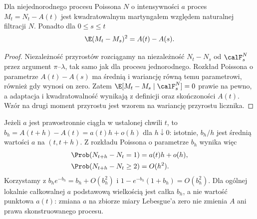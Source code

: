 \begin{wniosek}
Dla niejednorodnego procesu Poissona $N$ o intensywności $a$
proces $M_t=N_t-A(t)$ jest kwadratowalnym martyngałem
względem naturalnej filtracji $N$. Ponadto dla $0\le s\le t$
\[
\E(M_t-M_s)^2=A(t)-A(s).
\]
\end{wniosek}
\begin{proof}
Niezależność przyrostów rozciągamy na niezależność
$N_t-N_s$ od $\calF_s^N$ przez argument
$\pi$--$\lambda$, tak samo jak dla procesu jednorodnego.
Rozkład Poissona o parametrze $A(t)-A(s)$ ma średnią
i wariancję równą temu parametrowi, również gdy wynosi
on zero. Zatem
$\E[M_t-M_s\mid\calF_s^N]=0$ prawie na pewno,
a adaptacja i kwadratowalność wynikają z definicji
oraz skończoności $A(t)$. Wzór na drugi moment przyrostu
jest wzorem na wariancję przyrostu licznika.
\end{proof}

\begin{uwaga}
Jeżeli $a$ jest prawostronnie ciągła w ustalonej chwili $t$,
to $b_h=A(t+h)-A(t)=a(t)h+o(h)$ dla $h\downarrow0$:
istotnie, $b_h/h$ jest średnią wartości $a$ na $(t,t+h)$.
Z rozkładu Poissona o parametrze $b_h$ wynika więc
\[
\begin{aligned}
\Prob(N_{t+h}-N_t=1)&=a(t)h+o(h),\\
\Prob(N_{t+h}-N_t\ge2)&=O(h^2).
\end{aligned}
\]
Korzystamy z $b_he^{-b_h}=b_h+O(b_h^2)$
i $1-e^{-b_h}(1+b_h)=O(b_h^2)$.
Dla ogólnej lokalnie całkowalnej $a$ podstawową wielkością
jest całka $b_h$, a nie wartość punktowa $a(t)$:
zmiana $a$ na zbiorze miary Lebesgue'a zero nie zmienia $A$
ani prawa skonstruowanego procesu.
\end{uwaga}

